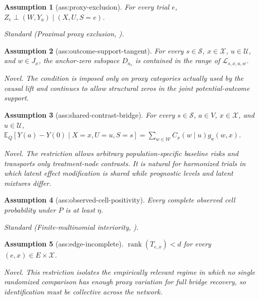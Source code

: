 \documentclass{article}
\newtheorem{assumption}{Assumption}
\begin{document}
\begin{assumption}[ass:proxy-exclusion]\label{ass:proxy-exclusion}
For every trial \(e\), \(Z_e\perp (W,Y_a)\mid(X,U,S=e)\).
\par\smallskip\noindent\emph{Standard} (Proximal proxy exclusion, \cite{SuRytgaardRavnEriksson2026}).
\end{assumption}

\begin{assumption}[ass:outcome-support-tangent]\label{ass:outcome-support-tangent}
For every \(s\in\mathcal S\), \(x\in\mathcal X\), \(u\in\mathcal U\), and \(w\in J_x\), the anchor-zero subspace \(D_{a_s}\) is contained in the range of \(\mathscr L_{s,x,u,w}\).
\par\smallskip\noindent\emph{Novel.} The condition is imposed only on proxy categories actually used by the causal lift and continues to allow structural zeros in the joint potential-outcome support.
\end{assumption}

\begin{assumption}[ass:shared-contrast-bridge]\label{ass:shared-contrast-bridge}
For every \(s\in\mathcal S\), \(a\in V\), \(x\in\mathcal X\), and \(u\in\mathcal U\), \(\mathbb E_Q[Y(a)-Y(0)\mid X=x,U=u,S=s]=\sum_{w\in\mathcal W}C_x(w\mid u)g_a(w,x)\).
\par\smallskip\noindent\emph{Novel.} The restriction allows arbitrary population-specific baseline risks and transports only treatment-node contrasts. It is natural for harmonized trials in which latent effect modification is shared while prognostic levels and latent mixtures differ.
\end{assumption}

\begin{assumption}[ass:observed-cell-positivity]\label{ass:observed-cell-positivity}
Every complete observed cell probability under \(P\) is at least \(\eta\).
\par\smallskip\noindent\emph{Standard} (Finite-multinomial interiority, \cite{vanDerVaart1998}).
\end{assumption}

\begin{assumption}[ass:edge-incomplete]\label{ass:edge-incomplete}
\(\operatorname{rank}(T_{e,x})<d\) for every \((e,x)\in E\times\mathcal X\).
\par\smallskip\noindent\emph{Novel.} This restriction isolates the empirically relevant regime in which no single randomized comparison has enough proxy variation for full bridge recovery, so identification must be collective across the network.
\end{assumption}
\end{document}
